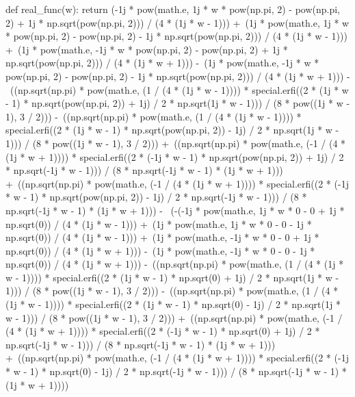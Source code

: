 \documentclass[a4paper, 14pt, titlepage, fleqn]{extarticle}
\begin{document}
\begin{specialx}
\begin{python}
def real_func(w):
    return (-1j * pow(math.e, 1j * w * pow(np.pi, 2) - pow(np.pi, 2) + 1j * np.sqrt(pow(np.pi, 2))) / (4 * (1j * w - 1))) +\
        (1j * pow(math.e, 1j * w * pow(np.pi, 2) - pow(np.pi, 2) - 1j * np.sqrt(pow(np.pi, 2))) / (4 * (1j * w - 1))) +\
        (1j * pow(math.e, -1j * w * pow(np.pi, 2) - pow(np.pi, 2) + 1j * np.sqrt(pow(np.pi, 2))) / (4 * (1j * w + 1))) -\
        (1j * pow(math.e, -1j * w * pow(np.pi, 2) - pow(np.pi, 2) - 1j * np.sqrt(pow(np.pi, 2))) / (4 * (1j * w + 1))) -\
        ((np.sqrt(np.pi) * pow(math.e, (1 / (4 * (1j * w - 1)))) * special.erfi((2 * (1j * w - 1) *
        np.sqrt(pow(np.pi, 2)) + 1j) / 2 * np.sqrt(1j * w - 1))) / (8 * pow((1j * w - 1), 3 / 2))) -\
        ((np.sqrt(np.pi) * pow(math.e, (1 / (4 * (1j * w - 1)))) * special.erfi((2 * (1j * w - 1) *
        np.sqrt(pow(np.pi, 2)) - 1j) / 2 * np.sqrt(1j * w - 1))) / (8 * pow((1j * w - 1), 3 / 2))) +\
        ((np.sqrt(np.pi) * pow(math.e, (-1 / (4 * (1j * w + 1)))) * special.erfi((2 * (-1j * w - 1) *
        np.sqrt(pow(np.pi, 2)) + 1j) / 2 * np.sqrt(-1j * w - 1))) / (8 * np.sqrt(-1j * w - 1) * (1j * w + 1))) +\
        ((np.sqrt(np.pi) * pow(math.e, (-1 / (4 * (1j * w + 1)))) * special.erfi((2 * (-1j * w - 1) *
        np.sqrt(pow(np.pi, 2)) - 1j) / 2 * np.sqrt(-1j * w - 1))) / (8 * np.sqrt(-1j * w - 1) * (1j * w + 1))) - \
        (-(-1j * pow(math.e, 1j * w * 0 - 0 + 1j * np.sqrt(0)) / (4 * (1j * w - 1))) +\
        (1j * pow(math.e, 1j * w * 0 - 0 - 1j * np.sqrt(0)) / (4 * (1j * w - 1))) +\
        (1j * pow(math.e, -1j * w * 0 - 0 + 1j * np.sqrt(0)) / (4 * (1j * w + 1))) -\
        (1j * pow(math.e, -1j * w * 0 - 0 - 1j * np.sqrt(0)) / (4 * (1j * w + 1))) -\
        ((np.sqrt(np.pi) * pow(math.e, (1 / (4 * (1j * w - 1)))) * special.erfi((2 * (1j * w - 1) *
        np.sqrt(0) + 1j) / 2 * np.sqrt(1j * w - 1))) / (8 * pow((1j * w - 1), 3 / 2))) -\
        ((np.sqrt(np.pi) * pow(math.e, (1 / (4 * (1j * w - 1)))) * special.erfi((2 * (1j * w - 1) *
        np.sqrt(0) - 1j) / 2 * np.sqrt(1j * w - 1))) / (8 * pow((1j * w - 1), 3 / 2))) +\
        ((np.sqrt(np.pi) * pow(math.e, (-1 / (4 * (1j * w + 1)))) * special.erfi((2 * (-1j * w - 1) *
        np.sqrt(0) + 1j) / 2 * np.sqrt(-1j * w - 1))) / (8 * np.sqrt(-1j * w - 1) * (1j * w + 1))) +\
        ((np.sqrt(np.pi) * pow(math.e, (-1 / (4 * (1j * w + 1)))) * special.erfi((2 * (-1j * w - 1) *
        np.sqrt(0) - 1j) / 2 * np.sqrt(-1j * w - 1))) / (8 * np.sqrt(-1j * w - 1) * (1j * w + 1))))



\end{python}
\end{specialx}
\end{document}
